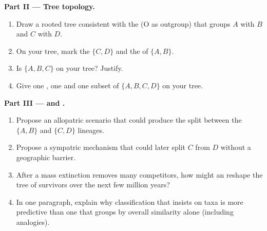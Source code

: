 \begin{problem}
\medskip
\noindent\textbf{Part II --- Tree topology.}
\begin{enumerate}[resume]
  \item Draw a rooted tree consistent with the  (O as outgroup)
        that groups $A$ with $B$ and $C$ with $D$.
  \item On your tree, mark the  $\{C,D\}$ and the  of
        $\{A,B\}$.
  \item Is $\{A,B,C\}$  on your tree? Justify.
  \item Give one , one  and one 
        subset of $\{A,B,C,D\}$ on your tree.
\end{enumerate}

\medskip
\noindent\textbf{Part III ---  and .}
\begin{enumerate}[resume]
  \item Propose an allopatric scenario that could produce the split
        between the $\{A,B\}$ and $\{C,D\}$ lineages.
  \item Propose a sympatric mechanism that could later split $C$ from
        $D$ without a geographic barrier.
  \item After a mass extinction removes many competitors, how might an
         reshape the tree of survivors over the next
        few million years?
  \item In one paragraph, explain why classification that insists on
         taxa is more predictive than one that groups by
        overall similarity alone (including analogies).
\end{enumerate}
\end{problem}
